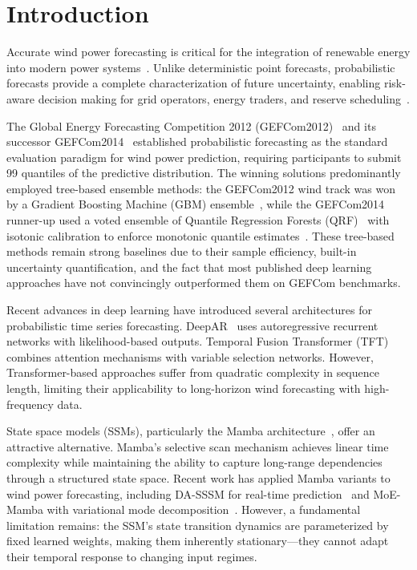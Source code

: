 \documentclass[review]{elsarticle}
\begin{document}
\section{Introduction}

Accurate wind power forecasting is critical for the integration of renewable energy into modern power systems~\cite{hong2016probabilistic}. Unlike deterministic point forecasts, probabilistic forecasts provide a complete characterization of future uncertainty, enabling risk-aware decision making for grid operators, energy traders, and reserve scheduling~\cite{pinson2013wind}.

The Global Energy Forecasting Competition 2012 (GEFCom2012)~\cite{hong2014global} and its successor GEFCom2014~\cite{hong2016probabilistic} established probabilistic forecasting as the standard evaluation paradigm for wind power prediction, requiring participants to submit 99 quantiles of the predictive distribution. The winning solutions predominantly employed tree-based ensemble methods: the GEFCom2012 wind track was won by a Gradient Boosting Machine (GBM) ensemble~\cite{landry2016probabilistic}, while the GEFCom2014 runner-up used a voted ensemble of Quantile Regression Forests (QRF)~\cite{meinshausen2006quantile} with isotonic calibration to enforce monotonic quantile estimates~\cite{nagy2016gefcom2014}. These tree-based methods remain strong baselines due to their sample efficiency, built-in uncertainty quantification, and the fact that most published deep learning approaches have not convincingly outperformed them on GEFCom benchmarks.

Recent advances in deep learning have introduced several architectures for probabilistic time series forecasting. DeepAR~\cite{salinas2020deepar} uses autoregressive recurrent networks with likelihood-based outputs. Temporal Fusion Transformer (TFT)~\cite{lim2021temporal} combines attention mechanisms with variable selection networks. However, Transformer-based approaches suffer from quadratic complexity in sequence length, limiting their applicability to long-horizon wind forecasting with high-frequency data.

State space models (SSMs), particularly the Mamba architecture~\cite{gu2023mamba,dao2024transformers}, offer an attractive alternative. Mamba's selective scan mechanism achieves linear time complexity while maintaining the ability to capture long-range dependencies through a structured state space. Recent work has applied Mamba variants to wind power forecasting, including DA-SSSM for real-time prediction~\cite{liu2026data} and MoE-Mamba with variational mode decomposition~\cite{seman2026decomposition}. However, a fundamental limitation remains: the SSM's state transition dynamics are parameterized by fixed learned weights, making them inherently stationary---they cannot adapt their temporal response to changing input regimes.
\end{document}
